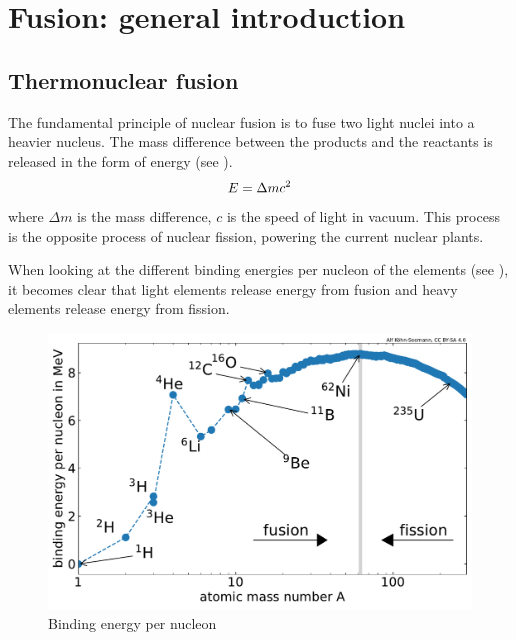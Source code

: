 \setchapterpreamble[u]{\margintoc}
\chapter{Fusion: general introduction}\label{Chapter1}


\section{Thermonuclear fusion}

The fundamental principle of nuclear fusion is to fuse two light nuclei into a heavier nucleus.
The mass difference between the products and the reactants is released in the form of energy (see ).
\begin{equation}
    E = \Delta m c^2
    \labeq{emc2}
\end{equation}
where $\Delta m$ is the mass difference, $c$ is the speed of light in vacuum.
This process is the opposite process of nuclear fission, powering the current nuclear plants.

When looking at the different binding energies per nucleon of the elements (see ), it becomes clear that light elements release energy from fusion and heavy elements release energy from fission.

\begin{figure} [h]
    \centering
    \includegraphics[width=\linewidth]{Figures/Chapter1/binding_energy_per_nucleon.pdf}
    \caption{Binding energy per nucleon \cite{kohn-seemann_alfkoehnfusion_plots_2021}}
\end{figure}

